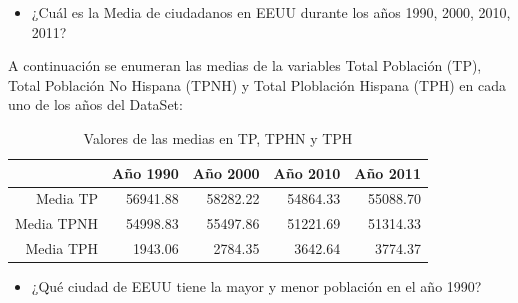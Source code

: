 \documentclass[conference]{IEEEtran}\usepackage[]{graphicx}\usepackage[]{color}
\begin{document}

\begin{itemize}
  \item ¿Cuál es la Media de ciudadanos en EEUU durante los años  1990, 2000, 2010, 2011?
\end{itemize}

A continuación se enumeran las medias de la variables Total Población (TP), Total Población  No Hispana (TPNH) y Total Ploblación Hispana (TPH) en cada uno de los años del DataSet:

\begin{table}[ht]
\centering
\begin{tabular}{rrrrr}
  \hline
 & Año 1990 & Año 2000 & Año 2010 & Año 2011 \\ 
  \hline
Media TP & 56941.88 & 58282.22 & 54864.33 & 55088.70 \\ 
  Media TPNH & 54998.83 & 55497.86 & 51221.69 & 51314.33 \\ 
  Media TPH & 1943.06 & 2784.35 & 3642.64 & 3774.37 \\ 
   \hline
\end{tabular}
\caption{Valores de las medias en TP, TPHN y TPH} 
\end{table}


\begin{itemize}
\item ¿Qué ciudad de EEUU tiene la mayor y menor población en el año 1990?
\end{itemize}
\end{document}
